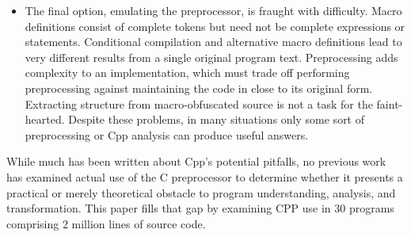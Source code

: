 \documentclass[10pt]{article}
\def\numpackages{30}
\def\numlines{2 million}
\begin{document}
\begin{itemize}
\item The final option, emulating the preprocessor, is fraught with
difficulty.  Macro definitions consist of complete tokens but need not
be complete expressions or statements.  Conditional compilation and
alternative macro definitions lead to very different results from a
single original program text.  Preprocessing adds complexity to an
implementation, which must trade off performing preprocessing against
maintaining the code in close to its original form.  Extracting
structure from macro-obfuscated source is not a task for the
faint-hearted.  Despite these problems, in many situations only some
sort of preprocessing or Cpp analysis can produce useful answers.

\end{itemize}

While much has been written about Cpp's potential pitfalls, no
previous work has examined actual use of the C preprocessor to
determine whether it presents a practical or merely theoretical
obstacle to program understanding, analysis, and transformation.  This
paper fills that gap by examining CPP use in {\numpackages} programs
comprising {\numlines} lines of source code.
\end{document}
